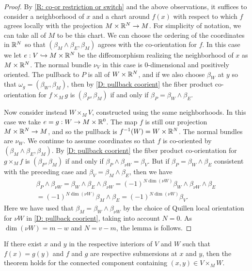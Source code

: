 \begin{proof}
	By \cref{R: co-or restriction or switch} and the above observations, it suffices to consider a neighborhood of $x$ and a chart around $f(x)$ with respect to which $f$ agrees locally with the projection $M\times \mathbb{R}^N\to M$.
	For simplicity of notation, we can take all of $M$ to be this chart.
	We can choose the ordering of the coordinates in $\mathbb{R}^N$ so that $(\beta_M\wedge \beta_E,\beta_M)$ agrees with the co-orientation for $f$.
	In this case we let $e:V\hookrightarrow M\times \mathbb{R}^N$ be the diffeomorphism realizing the neighborhood of $x$ as $M\times \mathbb{R}^N$.
	The normal bundle $\nu_V$ in this case is $0$-dimensional and positively oriented.
	The pullback to $P$ is all of $W\times \mathbb{R}^N$, and if we also choose $\beta_W$ at $y$ so that $\omega_g=(\beta_W,\beta_M)$, then by \cref{D: pullback coorient} the fiber product co-orientation for $f\times_Mg$ is $(\beta_P,\beta_M)$ if and only if $\beta_P=\beta_W\wedge \beta_E$.

	Now consider instead $W\times_MV$, constructed using the same neighborhoods.
	In this case we take $e=g:W\to M\times \mathbb{R}^0$.
	The map $f$ is still our projection $M\times \mathbb{R}^N\to M$, and so the pullback is $f^{-1}(W)=W\times \mathbb{R}^N$.
	The normal bundles are $\nu_W$.
	We continue to assume coordinates so that $f$ is co-oriented by $(\beta_M\wedge \beta_E, \beta_M)$.
	By \cref{D: pullback coorient} the fiber product co-orientation for $g\times_Mf$ is $(\beta_P,\beta_M)$ if and only if $\beta_P\wedge \beta_{\nu W} =\beta_V$.
	But if $\beta_P=\beta_W\wedge \beta_E$ consistent with the preceding case and $\beta_V=\beta_M\wedge \beta_E$, then we have
	\begin{multline*}\beta_P\wedge \beta_{\nu W}=\beta_W\wedge \beta_E\wedge \beta_{\nu W}=(-1)^{N\dim(\nu W)}\beta_W\wedge \beta_{\nu W}\wedge \beta_E\\=(-1)^{N\dim(\nu W)}\beta_M\wedge \beta_E=(-1)^{N\dim(\nu W)}\beta_V.\end{multline*}
	Here we have used that $\beta_M=\beta_W\wedge \beta_{\nu W}$ by the choice of Quillen local orientation for $\nu W$ in \cref{D: pullback coorient}, taking into account $N=0$.
	As $\dim(\nu W)=m-w$ and $N=v-m$, the lemma is follows.
\end{proof}

\begin{lemma}\label{L: sub/sub}
	If there exist $x$ and $y$ in the respective interiors of $V$ and $W$ such that $f(x)=g(y)$ and $f$ and $g$ are respective submersions at $x$ and $y$, then the theorem holds for the connected component containing $(x,y)\in V\times_MW$.
\end{lemma}

